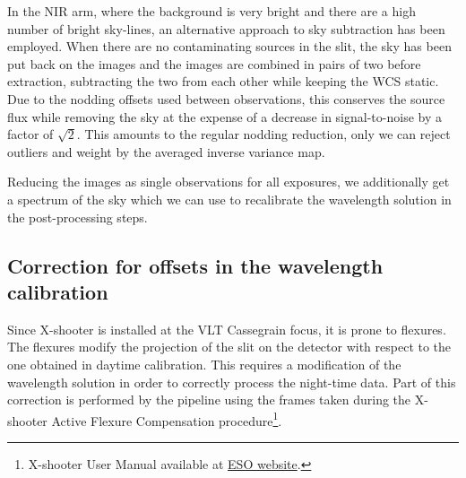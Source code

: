 \documentclass[longauth]{aa}    %
\begin{document}
In the NIR arm, where the background is very bright and there are a high number
of bright sky-lines, an alternative approach to sky subtraction has been
employed. When there are no contaminating sources in the slit, the sky has been
put back on the images and the images are combined in pairs of two before
extraction, subtracting the two from each other while keeping the WCS static.
Due to the nodding offsets used between observations, this conserves the
source flux while removing the sky at the expense of a decrease in
signal-to-noise by a factor of $\sqrt{2}$. This amounts to the regular nodding
reduction, only we can reject outliers and weight by the averaged inverse
variance map.

Reducing the images as single observations for all exposures, we additionally
get a spectrum of the sky which we can use to recalibrate the wavelength
solution in the post-processing steps.


\subsection{Correction for offsets in the wavelength calibration}    \label{wavecal}

Since X-shooter is installed at the VLT Cassegrain focus, it is prone to
flexures. The flexures modify the projection of the slit on the detector with
respect to the one obtained in daytime calibration. This requires a modification
of the wavelength solution in order to correctly process the night-time data.
Part of this correction is performed by the pipeline using the frames taken
during the X-shooter Active Flexure Compensation procedure\footnote{X-shooter
	User Manual available at
	\href{https://www.eso.org/sci/facilities/paranal/instruments/xshooter/doc.html}{ESO website}.}. 
\end{document}
